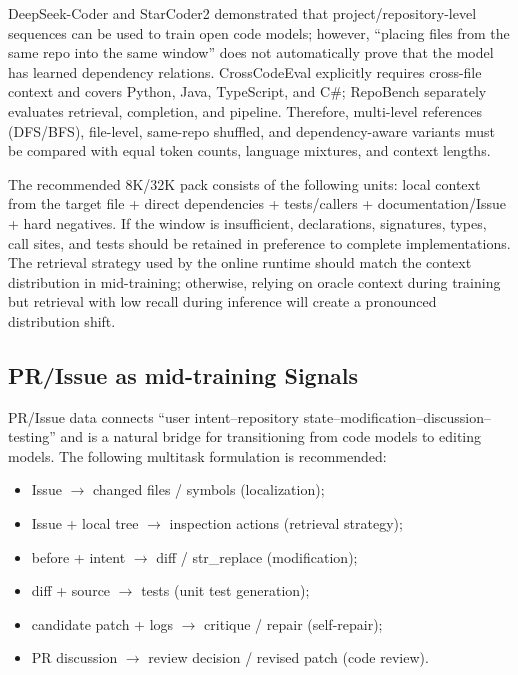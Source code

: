 \documentclass[10pt,a4paper,UTF8,fontset=none]{ctexart}
\newcommand{\ident}[1]{{\rmfamily #1}}
\begin{document}
DeepSeek-Coder and StarCoder2 demonstrated that project/repository-level sequences can be used to train open code models\cite{guo2024deepseekcoder,lozhkov2024starcoder2}; however, ``placing files from the same repo into the same window'' does not automatically prove that the model has learned dependency relations. CrossCodeEval explicitly requires cross-file context and covers Python, Java, TypeScript, and C\#\cite{ding2023crosscodeeval}; RepoBench separately evaluates retrieval, completion, and pipeline\cite{liu2023repobench}. Therefore, multi-level references (DFS/BFS), file-level, same-repo shuffled, and dependency-aware variants must be compared with equal token counts, language mixtures, and context lengths.

The recommended 8K/32K pack consists of the following units: local context from the target file + direct dependencies + tests/callers + documentation/Issue + hard negatives. If the window is insufficient, declarations, signatures, types, call sites, and tests should be retained in preference to complete implementations. The retrieval strategy used by the online runtime should match the context distribution in mid-training; otherwise, relying on oracle context during training but retrieval with low recall during inference will create a pronounced distribution shift.

\subsection{PR/Issue as mid-training Signals}

PR/Issue data connects ``user intent--repository state--modification--discussion--testing'' and is a natural bridge for transitioning from code models to editing models. The following multitask formulation is recommended:

\begin{itemize}
  \item Issue $\rightarrow$ changed files / symbols (localization);
  \item Issue + local tree $\rightarrow$ inspection actions (retrieval strategy);
  \item before + intent $\rightarrow$ diff / \ident{str\_replace} (modification);
  \item diff + source $\rightarrow$ tests (unit test generation);
  \item candidate patch + logs $\rightarrow$ critique / repair (self-repair);
  \item PR discussion $\rightarrow$ review decision / revised patch (code review).
\end{itemize}
\end{document}
